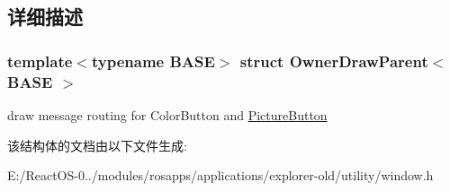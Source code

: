 \subsection{详细描述}
\subsubsection*{template$<$typename B\+A\+SE$>$\newline
struct Owner\+Draw\+Parent$<$ B\+A\+S\+E $>$}

draw message routing for Color\+Button and \hyperlink{struct_picture_button}{Picture\+Button} 

该结构体的文档由以下文件生成\+:\begin{DoxyCompactItemize}
\item 
E\+:/\+React\+O\+S-\/0../modules/rosapps/applications/explorer-\/old/utility/window.\+h\end{DoxyCompactItemize}
